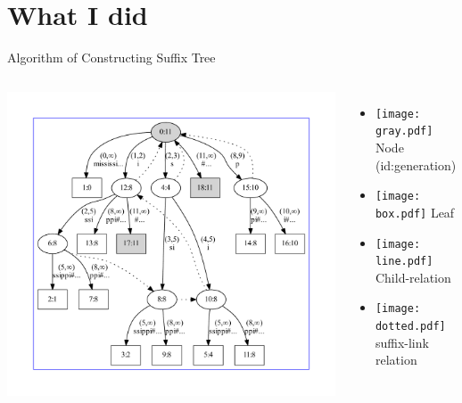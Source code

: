 \section{What I did} 

\begin{frame}{Algorithm of Constructing Suffix Tree}%
\begin{columns}%
\includegraphics[width=\textwidth]{mississippi.pdf}

\begin{itemize}
\item<2-> 
\texttt{[image: gray.pdf]} 
Node (id:generation)
\item<3-> 
\texttt{[image: box.pdf]} 
Leaf
\item<4-> 
\texttt{[image: line.pdf]} 
Child-relation
\item<5-> 
\texttt{[image: dotted.pdf]} 
suffix-link relation
\end{itemize}
\end{columns}
\end{frame}

